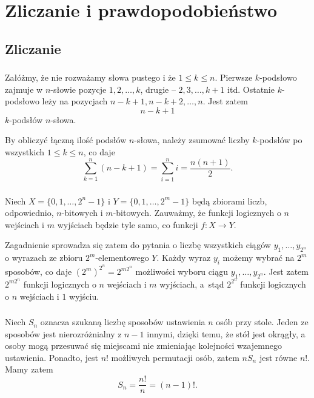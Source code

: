 \chapter{Zliczanie i prawdopodobieństwo}

\section{Zliczanie}

\subsection{} %
Załóżmy, że nie rozważamy słowa pustego i że $1\le k\le n$. Pierwsze \mbox{$k$-podsłowo} zajmuje w $n$-słowie pozycje $1,2,\dots,k$, drugie -- $2,3,\dots,k+1$ itd. Ostatnie $k$-podsłowo leży na pozycjach $n-k+1,n-k+2,\dots,n$. Jest zatem
\[
	n-k+1
\]
$k$-podsłów $n$-słowa.

By obliczyć łączną ilość podsłów $n$-słowa, należy zsumować liczby \mbox{$k$-podsłów} po wszystkich $1\le k\le n$, co daje
\[
	\sum_{k=1}^n(n-k+1) = \sum_{i=1}^ni = \frac{n(n+1)}{2}.
\]

\subsection{} %
Niech $X=\{ 0,1,\dots,2^n-1\}$ i $Y=\{ 0,1,\dots,2^m-1\}$ będą zbiorami liczb, odpowiednio, $n$-bitowych i $m$-bitowych. Zauważmy, że funkcji logicznych o $n$ wejściach i $m$ wyjściach będzie tyle samo, co funkcji $f\!:X\rightarrow Y$.

Zagadnienie sprowadza się zatem do pytania o liczbę wszystkich ciągów $y_1,\dots,y_{2^n}$ o wyrazach ze zbioru $2^m$-elementowego $Y$. Każdy wyraz $y_i$ możemy wybrać na $2^m$ sposobów, co daje $(2^m)^{2^n} = 2^{m2^n}$ możliwości wyboru ciągu $y_1,\dots,y_{2^n}$. Jest zatem $2^{m2^n}$ funkcji logicznych o $n$ wejściach i $m$ wyjściach, a~stąd $2^{2^n}$ funkcji logicznych o $n$ wejściach i $1$ wyjściu.

\subsection{} %
Niech $S_n$ oznacza szukaną liczbę sposobów ustawienia $n$ osób przy stole. Jeden ze sposobów jest nierozróżnialny z $n-1$ innymi, dzięki temu, że stół jest okrągły, a osoby mogą przesuwać się miejscami nie zmieniając kolejności wzajemnego ustawienia. Ponadto, jest $n!$ możliwych permutacji osób, zatem $nS_n$ jest równe $n!$. Mamy zatem
\[
	S_n = \frac{n!}{n} = (n-1)!.
\]

